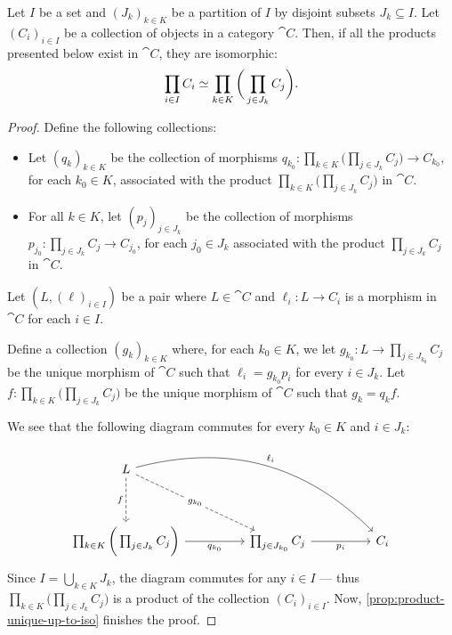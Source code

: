 \begin{proposition}
\label{prop:product-ordering-independent}
Let \(I\) be a set and \((J_k)_{k \in K}\) be a partition of \(I\) by disjoint
subsets \(J_k \subseteq I\). Let \((C_i)_{i \in I}\) be a collection of objects
in a category \(\cat C\). Then, if all the products presented below exist in
\(\cat C\), they are isomorphic:
\[
\prod_{i \in I} C_i \simeq \prod_{k \in K} \bigg(\prod_{j \in J_k} C_j \bigg).
\]
\end{proposition}

\begin{proof}
Define the following collections:
\begin{itemize}\setlength\itemsep{0em}
\item Let \((q_k)_{k \in K}\) be the collection of morphisms
  \(q_{k_0}: \prod_{k \in K} \bigg( \prod_{j \in J_k} C_j \bigg) \to C_{k_0}\),
  for each \(k_0 \in K\), associated with the product
  \(\prod_{k \in K} \bigg( \prod_{j \in J_k} C_j \bigg)\) in \(\cat C\).

\item For all \(k \in K\), let \((p_j)_{j \in J_k}\) be the collection of
  morphisms \(p_{j_0}: \prod_{j \in J_k} C_j \to C_{j_0}\), for each
  \(j_0 \in J_k\) associated with the product \(\prod_{j \in J_k} C_j\) in
  \(\cat C\).
\end{itemize}
Let \((L, (\ell)_{i \in I})\) be a pair where \(L \in \cat C\) and
\(\ell_i: L \to C_i\) is a morphism in \(\cat C\) for each \(i \in I\).

Define a collection \((g_k)_{k \in K}\) where, for each \(k_0 \in K\), we let
\(g_{k_0}: L \to \prod_{j \in J_{k_0}} C_j\) be the unique morphism of
\(\cat C\) such that \(\ell_i = g_{k_0} p_i\) for every \(i \in J_k\). Let
\(f: \prod_{k \in K} \bigg( \prod_{j \in J_k} C_j \bigg)\) be the unique
morphism of \(\cat C\) such that \(g_k = q_k f\).

We see that the following diagram commutes for every \(k_0 \in K\) and
\(i \in J_k\):
\[
\begin{tikzcd}
L \ar[rrrrdd, bend left, "\ell_i"]
\ar[dd, dashed, "f"']
\ar[rrdd, dashed, "g_{k_0}" description]
& & & &\\ & & & & \\
\prod_{k \in K} \bigg( \prod_{j \in J_k} C_j \bigg)
\ar[rr, "q_{k_0}"']
&
&\prod_{j \in J_{k_0}} C_j \ar[rr, "p_i"']
&
&C_i
\end{tikzcd}
\]
Since \(I = \bigcup_{k \in K} J_k\), the diagram commutes for any \(i \in I\)
--- thus \(\prod_{k \in K} \bigg( \prod_{j \in J_k} C_j \bigg)\) is a product of
the collection \((C_i)_{i \in I}\). Now, \cref{prop:product-unique-up-to-iso}
finishes the proof.
\end{proof}


